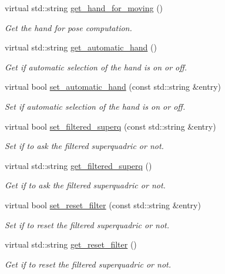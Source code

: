 \begin{DoxyCompactItemize}
virtual std\-::string \hyperlink{classexperimentOne__IDL_a9b24bdfe4b5bff2970a63126ca100706}{get\-\_\-hand\-\_\-for\-\_\-moving} ()
\begin{DoxyCompactList}\small\item\em Get the hand for pose computation. \end{DoxyCompactList}\item 
virtual std\-::string \hyperlink{classexperimentOne__IDL_a5cfa4d56fb13586ba889ff11031e88d1}{get\-\_\-automatic\-\_\-hand} ()
\begin{DoxyCompactList}\small\item\em Get if automatic selection of the hand is on or off. \end{DoxyCompactList}\item 
virtual bool \hyperlink{classexperimentOne__IDL_a1612f36ed85af9e6dbc595405e733977}{set\-\_\-automatic\-\_\-hand} (const std\-::string \&entry)
\begin{DoxyCompactList}\small\item\em Set if automatic selection of the hand is on or off. \end{DoxyCompactList}\item 
virtual bool \hyperlink{classexperimentOne__IDL_a36a7306993eeae5778bacac4f4154126}{set\-\_\-filtered\-\_\-superq} (const std\-::string \&entry)
\begin{DoxyCompactList}\small\item\em Set if to ask the filtered superquadric or not. \end{DoxyCompactList}\item 
virtual std\-::string \hyperlink{classexperimentOne__IDL_a855625d91d880d87206c643a831c3453}{get\-\_\-filtered\-\_\-superq} ()
\begin{DoxyCompactList}\small\item\em Get if to ask the filtered superquadric or not. \end{DoxyCompactList}\item 
virtual bool \hyperlink{classexperimentOne__IDL_a0e42d009f1d2bfbaae9906c4775dd922}{set\-\_\-reset\-\_\-filter} (const std\-::string \&entry)
\begin{DoxyCompactList}\small\item\em Set if to reset the filtered superquadric or not. \end{DoxyCompactList}\item 
virtual std\-::string \hyperlink{classexperimentOne__IDL_aefa9eabe3c0b14707eb2d8e24f3e0312}{get\-\_\-reset\-\_\-filter} ()
\begin{DoxyCompactList}\small\item\em Get if to reset the filtered superquadric or not. \end{DoxyCompactList}\item 

\end{DoxyCompactItemize}
